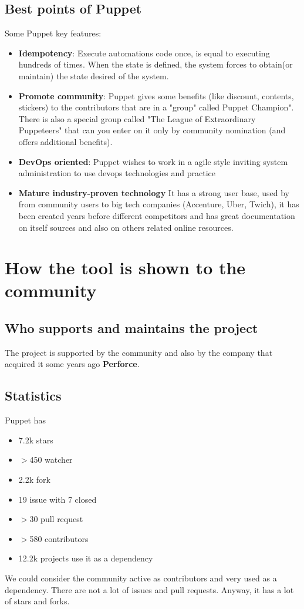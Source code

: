 \documentclass[12pt,a4paper,openright,twoside]{book}
\begin{document}
\subsection{Best points of Puppet}

Some Puppet key features:

\begin{itemize}
    \item \textbf{Idempotency}: Execute automations code once, is equal to executing hundreds of times. When the state is defined, the system forces to obtain(or maintain) the state desired of the system.
    \item \textbf{Promote community}: Puppet gives some benefits (like discount, contents, stickers) to the contributors that are in a "group" called Puppet Champion".
    There is also a special group called "The League of Extraordinary Puppeteers" that can you enter on it only by community nomination (and offers additional benefits).
    \item \textbf{DevOps oriented}: Puppet wishes to work in a agile style inviting system administration to use devops technologies and practice
    \item \textbf{Mature industry-proven technology} It has a strong user base, used by from community users to big tech companies (Accenture, Uber, Twich), it has been created years before different competitors and has great documentation on itself sources and also on others related online resources.
\end{itemize}

\section{How the tool is shown to the community}

\subsection{Who supports and maintains the project}
The project is supported by the community and also by the company that acquired it some years ago \textbf{Perforce}.

\subsection{Statistics}

Puppet has 
\begin{itemize}
    \item 7.2k stars
    \item $>$450 watcher
    \item 2.2k fork
    \item 19 issue with 7 closed
    \item $>$30 pull request
    \item $>$580 contributors
    \item 12.2k projects use it as a dependency
\end{itemize}
\cite{puppetGitHubProject}
We could consider the community active as contributors and very used as a dependency. There are not a lot of issues and pull requests. Anyway, it has a lot of stars and forks.
\end{document}
